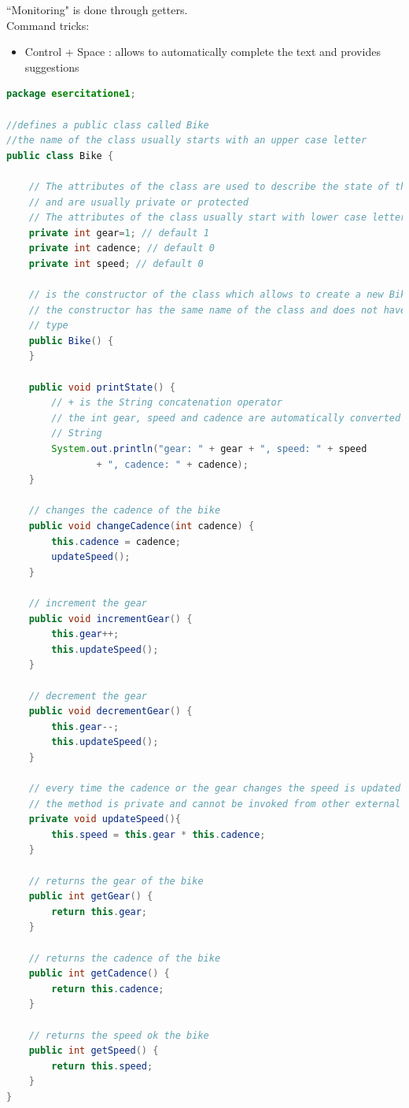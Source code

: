 \documentclass{article}
\theoremstyle{definition}
\begin{document}
``Monitoring" is done through getters.\\
Command tricks:
\begin{itemize}
\item Control + Space : allows to automatically complete the text and provides suggestions
\end{itemize}

\begin{lstlisting}[language=Java,escapechar=|]
package esercitatione1;

//defines a public class called Bike 
//the name of the class usually starts with an upper case letter
public class Bike {

	// The attributes of the class are used to describe the state of the class
	// and are usually private or protected
	// The attributes of the class usually start with lower case letters
	private int gear=1; // default 1
	private int cadence; // default 0
	private int speed; // default 0

	// is the constructor of the class which allows to create a new Bike
	// the constructor has the same name of the class and does not have a return
	// type
	public Bike() {
	}

	public void printState() {
		// + is the String concatenation operator
		// the int gear, speed and cadence are automatically converted into
		// String
		System.out.println("gear: " + gear + ", speed: " + speed
				+ ", cadence: " + cadence);
	}
    
    // changes the cadence of the bike
	public void changeCadence(int cadence) {
		this.cadence = cadence;
		updateSpeed();
	}

	// increment the gear
	public void incrementGear() {
		this.gear++;
		this.updateSpeed();
	}

	// decrement the gear
	public void decrementGear() {
		this.gear--;
		this.updateSpeed();
	}

	// every time the cadence or the gear changes the speed is updated
	// the method is private and cannot be invoked from other external classes
	private void updateSpeed(){
		this.speed = this.gear * this.cadence; 
	}
	
	// returns the gear of the bike
	public int getGear() {
		return this.gear;
	}

	// returns the cadence of the bike
	public int getCadence() {
		return this.cadence;
	}

	// returns the speed ok the bike
	public int getSpeed() {
		return this.speed;
	}
}
\end{lstlisting}
\end{document}
